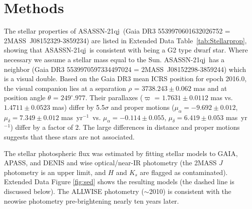 \documentclass[sn-nature,oneside]{sn-jnl}%
\newcommand{\asas}{ASASSN-21qj}
\newcommand{\masyr}{mas~yr$^{-1}$}
\begin{document}







\setcounter{figure}{0}    

\renewcommand\figurename{Extended Data Figure}%
\renewcommand\tablename{Extended Data Table}%


\section{Methods}\label{sec:methods}

The stellar properties of \asas\ (Gaia DR3 5539970601632026752 = 2MASS~J08152329-3859234) are listed in Extended Data Table~\ref{tab:Stellarprop}, showing that \asas\ is consistent with being a G2 type dwarf star.
%
Where necessary we assume a stellar mass equal to the Sun.
%
\asas\  has a neighbor (Gaia DR3 5539970597334497024 = 2MASS~J08152298-3859244) which is a visual double.
%
Based on the Gaia DR3 mean ICRS position for epoch 2016.0, the visual companion lies at a separation $\rho$ = $3738.243\pm0.062$ mas and at position angle $\theta$ = $249^{\circ}.977$.
%
Their parallaxes ($\varpi$ = $1.7631\pm0.0112$ mas vs. $1.4711\pm0.0523$ mas) differ by 5.5$\sigma$ and proper motions ($\mu_{\alpha} = -9.692\pm0.012$, $\mu_{\delta} = 7.349\pm0.012$ \masyr\, vs. $\mu_{\alpha} = -0.114\pm0.055$, $\mu_{\delta} = 6.419\pm0.053$ \masyr) differ by a factor of 2.
%
The large differences in distance and proper motions suggests that these stars are not associated.

The stellar photospheric flux was estimated by fitting stellar models to GAIA, APASS, and DENIS and \gls{wise} optical/near-IR photometry (the 2MASS $J$ photometry is an upper limit, and $H$ and $K_s$ are flagged as contaminated).
%
Extended Data Figure \ref{fig:sed} shows the resulting models (the dashed line is discussed below).
%
The ALLWISE photometry ($\sim$2010) is consistent with the \gls{neowise} photometry pre-brightening nearly ten years later.
%
\end{document}
